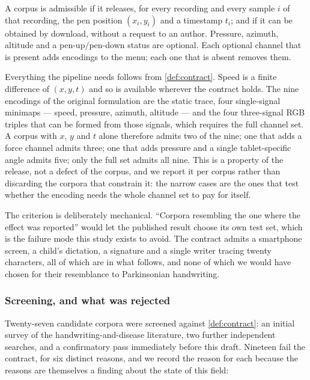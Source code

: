 \begin{definition}
\label{def:contract}
A corpus is admissible if it releases, for every recording and every sample $i$ of that recording,
the pen position $(x_i, y_i)$ and a timestamp $t_i$; and if it can be obtained by download, without
a request to an author. Pressure, azimuth, altitude and a pen-up/pen-down status are optional. Each
optional channel that is present adds encodings to the menu; each one that is absent removes them.
\end{definition}

Everything the pipeline needs follows from \cref{def:contract}. Speed is a finite difference of
$(x, y, t)$ and so is available wherever the contract holds. The nine encodings of the original
formulation \citep{prior2027minimaps} are the static trace, four single-signal minimaps --- speed,
pressure, azimuth, altitude --- and the four three-signal RGB triples that can be formed from those
signals, which requires the full channel set. A corpus with $x$, $y$ and $t$ alone therefore admits
two of the nine; one that adds a force channel admits three; one that adds pressure and a single
tablet-specific angle admits five; only the full set admits all nine. This is a property of the
release, not a defect of the corpus, and we report it per corpus rather than discarding the corpora
that constrain it: the narrow cases are the ones that test whether the encoding needs the whole
channel set to pay for itself.

The criterion is deliberately mechanical. ``Corpora resembling the one where the effect was
reported'' would let the published result choose its own test set, which is the failure mode this
study exists to avoid. The contract admits a smartphone screen, a child's dictation, a signature
and a single writer tracing twenty characters, all of which are in what follows, and none of which
we would have chosen for their resemblance to Parkinsonian handwriting.

\subsubsection{Screening, and what was rejected}
\label{sec:screening}

Twenty-seven candidate corpora were screened against \cref{def:contract}: an initial survey of the
handwriting-and-disease literature, two further independent searches, and a confirmatory pass
immediately before this draft. Nineteen fail the contract, for six distinct reasons, and we record
the reason for each because the reasons are themselves a finding about the state of this field:

